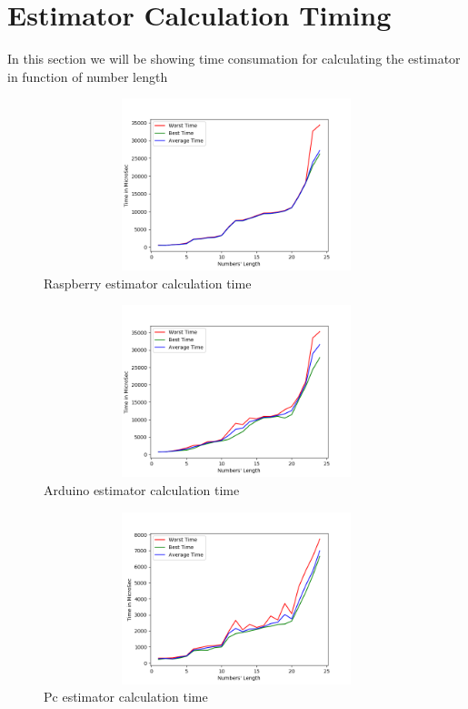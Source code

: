 \section{Estimator Calculation Timing}
In this section we will be showing time consumation for calculating the estimator in function of number length
\begin{figure} 

	\hfill
	\includegraphics[scale=0.5,width=12cm,height=5cm]{result/raspberry_res.png}
	\caption{Raspberry estimator calculation time}
	\centering
	\label{fig:x raspberry_res}
	\hspace*{\fill}
\end{figure}

\begin{figure} 

	\hfill
	\includegraphics[scale=0.5,width=12cm,height=5cm]{result/arduino_res.png}
	\caption{Arduino estimator calculation time}
	\centering
	\label{fig:x arduino_res}
	\hspace*{\fill}
\end{figure}

\begin{figure} 

	\hfill
	\includegraphics[scale=0.5,width=12cm,height=5cm]{result/pc_res.png}
	\caption{Pc estimator calculation time}
	\centering
	\label{fig:x pc_res}
	\hspace*{\fill}
\end{figure}